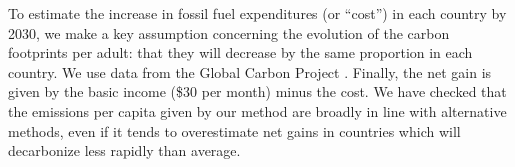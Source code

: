 \documentclass[12pt,english]{article}
\begin{document}
\begin{tcolorbox}
{To estimate the increase in fossil fuel expenditures (or ``cost'') in each country by 2030, we make a key assumption concerning the evolution of the carbon footprints per adult: that they will decrease by the same proportion in each country. We use data from the Global Carbon Project \citep{peters_synthesis_2012}. %
Finally, the net gain is given by the basic income (\$30 per month) minus the cost. 
We have checked that the emissions per capita given by our method are broadly in line with alternative methods, even if it tends to overestimate net gains in countries which will decarbonize less rapidly than average.

}
\end{tcolorbox}
\end{document}
